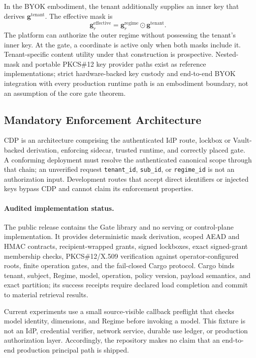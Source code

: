 \documentclass[11pt,a4paper]{article}
\newcommand{\bg}{\mathbf{g}}
\begin{document}
In the BYOK embodiment, the tenant additionally supplies an inner
key that derives $\bg^{\mathrm{tenant}}$.  The effective mask is
\[
\bg^{\mathrm{effective}}_r =
\bg^{\mathrm{regime}}_r \odot \bg^{\mathrm{tenant}}.
\]
The platform can authorize the outer regime without possessing the
tenant's inner key.  At the gate, a coordinate is active only when
both masks include it.  Tenant-specific content utility under that
construction is prospective.  Nested-mask and portable PKCS\#12 key
provider paths exist as reference implementations; strict hardware-backed
key custody and
end-to-end BYOK integration with every production runtime path is an
embodiment boundary, not an assumption of the core gate theorem.

\subsection{Mandatory Enforcement Architecture}

CDP is an architecture comprising the authenticated IdP
route, lockbox or Vault-backed derivation, enforcing sidecar, trusted
runtime, and correctly placed gate.  A conforming deployment must
resolve the authenticated canonical scope through that chain; an
unverified request \texttt{tenant\_id}, \texttt{sub\_id}, or
\texttt{regime\_id} is not an authorization input.
Development routes that accept direct identifiers or injected keys
bypass CDP and cannot claim its enforcement properties.

\paragraph{Audited implementation status.}
The public release contains the Gate library and no serving or control-plane
implementation. It provides deterministic mask derivation, scoped AEAD and
HMAC contracts, recipient-wrapped grants, signed lockboxes, exact signed-grant
membership checks, PKCS\#12/X.509 verification against operator-configured
roots, finite operation gates, and the fail-closed Cargo protocol. Cargo binds
tenant, subject, Regime, model, operation, policy version, payload semantics,
and exact partition; its success receipts require declared load completion and
commit to material retrieval results.

Current experiments use a small source-visible callback preflight that checks
model identity, dimensions, and Regime before invoking a model. This fixture is
not an IdP, credential verifier, network service, durable use ledger, or
production authorization layer. Accordingly, the repository makes no claim
that an end-to-end production principal path is shipped.
\end{document}
